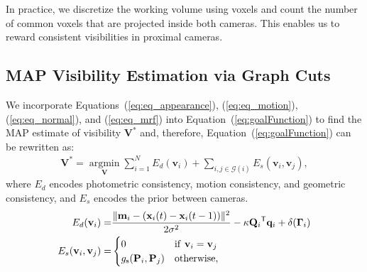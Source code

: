 \documentclass[10pt,twocolumn,letterpaper]{article}
\begin{document}

In practice, we discretize the working volume using voxels and count the number of common voxels that are projected inside both cameras. This enables us to reward consistent visibilities in proximal cameras. %

\subsection{MAP Visibility Estimation via Graph Cuts\label{sub:graphcuts}} 
We incorporate Equations~(\ref{eq:eq_appearance}), (\ref{eq:eq_motion}), (\ref{eq:eq_normal}), and (\ref{eq:eq_mrf}) into Equation~(\ref{eq:goalFunction}) to find the MAP estimate of visibility $\mathbf{V^*}$ and, therefore, Equation~(\ref{eq:goalFunction}) can be rewritten as:
\begin{eqnarray}
\mathbf{V^*} = \underset{\mathbf{V}}{\operatorname{argmin}}  \sum_{i=1}^{N} E_d( \mathbf{v}_i) + \sum_{ i, j \in \mathcal{G}(i) } E_s (\mathbf{v}_i,\mathbf{v}_j),
\end{eqnarray}
where $E_d$ encodes photometric consistency, motion consistency, and geometric consistency, and $E_s$ encodes the prior between cameras. 
\begin{eqnarray}
E_d(\mathbf{v}_i) =& \frac{\| \mathbf{m}_i - ( \mathbf{x}_i(t) - \mathbf{x}_i(t-1) )  \|^2} {2\sigma^2} -\kappa {\mathbf{Q}_i}^\mathsf{T} \mathbf{q}_i + \delta(\mathbf{\Gamma}_i ) \nonumber\\
E_s(\mathbf{v}_i,\mathbf{v}_j) =& \begin{cases} 0 & {\rm if~} \mathbf{v}_i=\mathbf{v}_j  \nonumber\\                                                             
		g_\textrm{s}(\mathbf{P}_i,\mathbf{P}_j) & {\rm otherwise,}\end{cases} 
\end{eqnarray}
\end{document}
